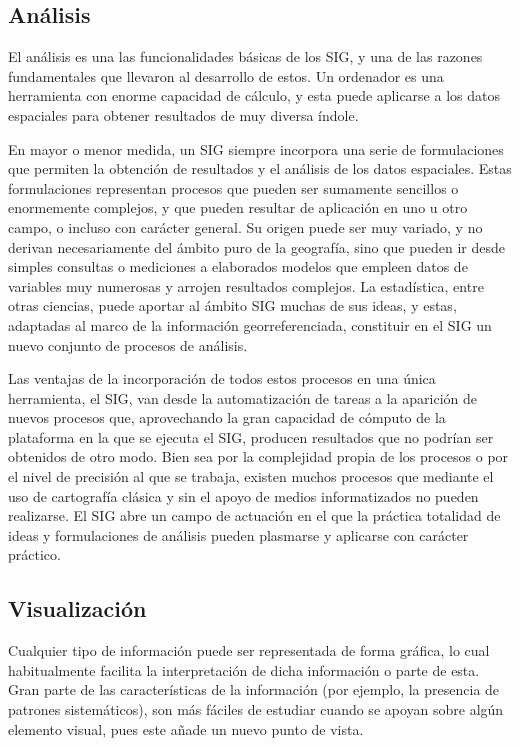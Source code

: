 \subsection{Análisis}

El análisis es una las funcionalidades básicas de los SIG, y una de las razones fundamentales que llevaron al desarrollo de estos. Un ordenador es una herramienta con enorme capacidad de cálculo, y esta puede aplicarse a los datos espaciales para obtener resultados de muy diversa índole.

En mayor o menor medida, un SIG siempre incorpora una serie de formulaciones que permiten la obtención de resultados y el análisis de los datos espaciales. Estas formulaciones representan procesos que pueden ser sumamente sencillos o enormemente complejos, y que pueden resultar de aplicación en uno u otro campo, o incluso con carácter general. Su origen puede ser muy variado, y no derivan  necesariamente del ámbito puro de la geografía, sino que pueden ir desde simples consultas o mediciones a elaborados modelos que empleen datos de variables muy numerosas y arrojen resultados complejos. La estadística, entre otras ciencias, puede aportar al ámbito SIG muchas de sus ideas, y estas, adaptadas al marco de la información georreferenciada, constituir en el SIG un nuevo conjunto de procesos de análisis.

Las ventajas de la incorporación de todos estos procesos en una única herramienta, el SIG, van desde la automatización de tareas a la aparición de nuevos procesos que, aprovechando la gran capacidad de cómputo de la plataforma en la que se ejecuta el SIG, producen resultados que no podrían ser obtenidos de otro modo. Bien sea por la complejidad propia de los procesos o por el nivel de precisión al que se trabaja, existen muchos procesos que mediante el uso de cartografía clásica y sin el apoyo de medios informatizados no pueden realizarse. El SIG abre un campo de actuación en el que la práctica totalidad de ideas y formulaciones de análisis pueden plasmarse y aplicarse con carácter práctico.


\subsection{Visualización}

Cualquier tipo de información puede ser representada de forma gráfica, lo cual habitualmente facilita la interpretación de dicha información o parte de esta. Gran parte de las características de la información (por ejemplo, la presencia de patrones sistemáticos), son más fáciles de estudiar cuando se apoyan sobre algún elemento visual, pues este añade un nuevo punto de vista.


